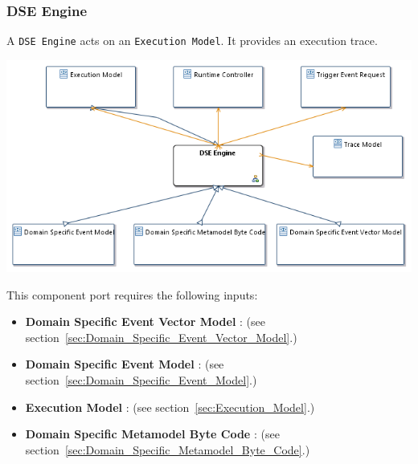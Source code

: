 \documentclass{gemoc} %
\begin{document}
\subsubsection{DSE Engine}
\label{sec:DSE_Engine}
A \texttt{DSE Engine} acts on an \texttt{Execution Model}.
It provides an execution trace.
\begin{center}
\includegraphics*[trim=0.0cm 0.0cm 0cm 0.0cm, clip=true]{../images/generated/Generated_DSE_Engine.png}
\end{center}

This component port requires the following inputs:
\begin{itemize}
  \item \textbf{Domain Specific Event Vector Model} :
(see section~\ref{sec:Domain_Specific_Event_Vector_Model}.)
  \item \textbf{Domain Specific Event Model} :
(see section~\ref{sec:Domain_Specific_Event_Model}.)
  \item \textbf{Execution Model} :
(see section~\ref{sec:Execution_Model}.)
  \item \textbf{Domain Specific Metamodel Byte Code} :
(see section~\ref{sec:Domain_Specific_Metamodel_Byte_Code}.)
\end{itemize}
\end{document}
